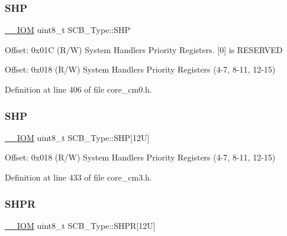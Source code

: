 \mbox{\label{struct_s_c_b___type_a5c40d124f95a3f7f431a3d5409d6ad28}} 
\subsubsection{\texorpdfstring{S\+HP}{SHP}\hspace{0.1cm}{\footnotesize\ttfamily [1/2]}}
{\footnotesize\ttfamily \hyperlink{core__sc300_8h_ab6caba5853a60a17e8e04499b52bf691}{\+\_\+\+\_\+\+I\+OM} uint8\+\_\+t S\+C\+B\+\_\+\+Type\+::\+S\+HP}

Offset\+: 0x01C (R/W) System Handlers Priority Registers. \mbox{[}0\mbox{]} is R\+E\+S\+E\+R\+V\+ED

Offset\+: 0x018 (R/W) System Handlers Priority Registers (4-\/7, 8-\/11, 12-\/15) 

Definition at line 406 of file core\+\_\+cm0.\+h.

\mbox{\label{struct_s_c_b___type_a9b05f74580fc93daa7fe2f0e1c9c5663}} 
\subsubsection{\texorpdfstring{S\+HP}{SHP}\hspace{0.1cm}{\footnotesize\ttfamily [2/2]}}
{\footnotesize\ttfamily \hyperlink{core__sc300_8h_ab6caba5853a60a17e8e04499b52bf691}{\+\_\+\+\_\+\+I\+OM} uint8\+\_\+t S\+C\+B\+\_\+\+Type\+::\+S\+HP\mbox{[}12\+U\mbox{]}}

Offset\+: 0x018 (R/W) System Handlers Priority Registers (4-\/7, 8-\/11, 12-\/15) 

Definition at line 433 of file core\+\_\+cm3.\+h.

\mbox{\label{struct_s_c_b___type_afdab23abd301033bb318c7b188b377db}} 
\subsubsection{\texorpdfstring{S\+H\+PR}{SHPR}}
{\footnotesize\ttfamily \hyperlink{core__sc300_8h_ab6caba5853a60a17e8e04499b52bf691}{\+\_\+\+\_\+\+I\+OM} uint8\+\_\+t S\+C\+B\+\_\+\+Type\+::\+S\+H\+PR\mbox{[}12\+U\mbox{]}}

